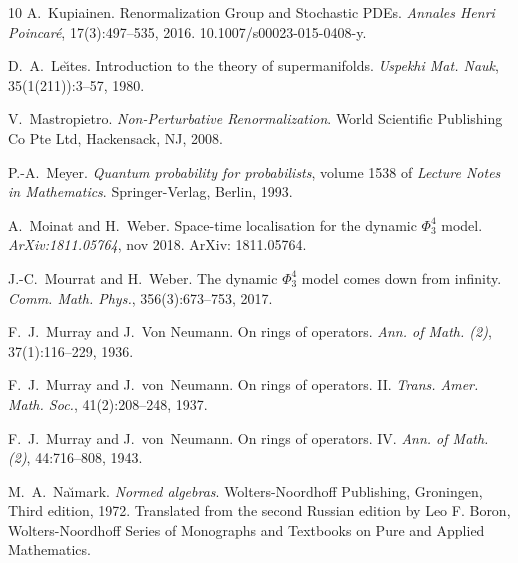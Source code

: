 \documentclass{article}
\newcommand{\tmtextit}[1]{{\itshape{#1}}}
\begin{document}
\begin{thebibliography}{10}
  A.~Kupiainen.
  {\newblock}Renormalization Group and Stochastic PDEs.
  {\newblock}\tmtextit{Annales Henri Poincar{\'e}}, 17(3):497--535, 2016.
  {\newblock}\href{Https://doi.org/10.1007/s00023-015-0408-y}{}10.1007/s00023-015-0408-y.{\newblock}
  
  D.~A.~Le\u{\i}tes. {\newblock}Introduction to the theory of
  supermanifolds. {\newblock}\tmtextit{Uspekhi Mat. Nauk}, 35(1(211)):3--57,
  1980.{\newblock}
  
  V.~Mastropietro.
  {\newblock}\tmtextit{Non-Perturbative Renormalization}. {\newblock}World
  Scientific Publishing Co Pte Ltd, Hackensack, NJ, 2008.{\newblock}
  
  P.-A.~Meyer. {\newblock}\tmtextit{Quantum probability
  for probabilists},  volume  1538  of \tmtextit{Lecture Notes in
  Mathematics}. {\newblock}Springer-Verlag, Berlin, 1993.{\newblock}
  
  A.~Moinat  and  H.~Weber.
  {\newblock}Space-time localisation for the dynamic $\Phi^4_3$ model.
  {\newblock}\tmtextit{ArXiv:1811.05764}, nov 2018. {\newblock}ArXiv:
  1811.05764.{\newblock}
  
  J.-C.~Mourrat  and  H.~Weber. {\newblock}The dynamic
  $\Phi^4_3$ model comes down from infinity. {\newblock}\tmtextit{Comm. Math.
  Phys.}, 356(3):673--753, 2017.{\newblock}
  
  F.~J.~Murray  and  J.~Von Neumann. {\newblock}On rings
  of operators. {\newblock}\tmtextit{Ann. of Math. (2)}, 37(1):116--229,
  1936.{\newblock}
  
  F.~J.~Murray  and  J.~von~Neumann. {\newblock}On rings
  of operators. II. {\newblock}\tmtextit{Trans. Amer. Math. Soc.},
  41(2):208--248, 1937.{\newblock}
  
  F.~J.~Murray  and  J.~von~Neumann. {\newblock}On rings
  of operators. IV. {\newblock}\tmtextit{Ann. of Math. (2)}, 44:716--808,
  1943.{\newblock}
  
  M.~A.~Na\u{\i}mark. {\newblock}\tmtextit{Normed algebras}.
  {\newblock}Wolters-Noordhoff Publishing, Groningen, Third  edition, 1972.
  {\newblock}Translated from the second Russian edition by Leo F. Boron,
  Wolters-Noordhoff Series of Monographs and Textbooks on Pure and Applied
  Mathematics.{\newblock}
  

\end{thebibliography}
\end{document}
